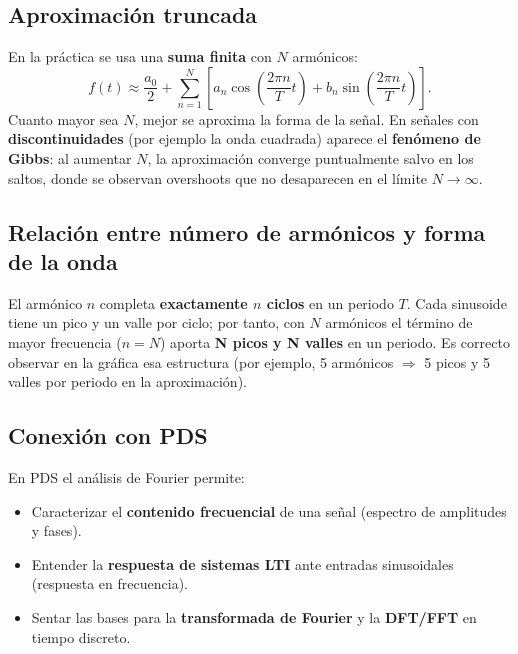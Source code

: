 \documentclass[12pt,a4paper]{article}
\begin{document}
\subsection{Aproximación truncada}

En la práctica se usa una \textbf{suma finita} con \(N\) armónicos:
\begin{equation}
  f(t) \approx \frac{a_0}{2} + \sum_{n=1}^{N} \left[ a_n \cos\left(\frac{2\pi n}{T}t\right) + b_n \sin\left(\frac{2\pi n}{T}t\right) \right].
  \label{eq:truncada}
\end{equation}
Cuanto mayor sea \(N\), mejor se aproxima la forma de la señal. En señales con \textbf{discontinuidades} (por ejemplo la onda cuadrada) aparece el \textbf{fenómeno de Gibbs}: al aumentar \(N\), la aproximación converge puntualmente salvo en los saltos, donde se observan overshoots que no desaparecen en el límite \(N \to \infty\).

\subsection{Relación entre número de armónicos y forma de la onda}

El armónico \(n\) completa \textbf{exactamente \(n\) ciclos} en un periodo \(T\). Cada sinusoide tiene un pico y un valle por ciclo; por tanto, con \(N\) armónicos el término de mayor frecuencia (\(n=N\)) aporta \textbf{N picos y N valles} en un periodo. Es correcto observar en la gráfica esa estructura (por ejemplo, 5 armónicos \(\Rightarrow\) 5 picos y 5 valles por periodo en la aproximación).

\subsection{Conexión con PDS}

En PDS el análisis de Fourier permite:
\begin{itemize}
  \item Caracterizar el \textbf{contenido frecuencial} de una señal (espectro de amplitudes y fases).
  \item Entender la \textbf{respuesta de sistemas LTI} ante entradas sinusoidales (respuesta en frecuencia).
  \item Sentar las bases para la \textbf{transformada de Fourier} y la \textbf{DFT/FFT} en tiempo discreto.
\end{itemize}

\end{document}
